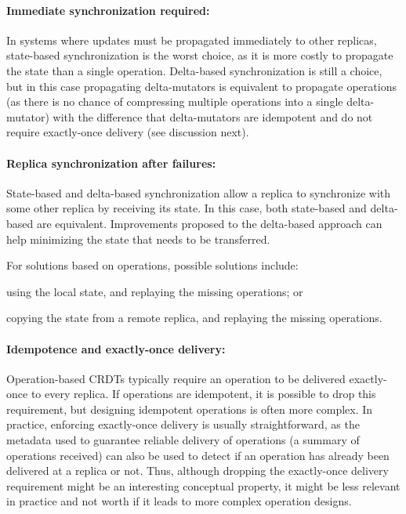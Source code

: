 \documentclass[12pt]{article}
\begin{document}
\paragraph{Immediate synchronization required:} In systems where updates
must be propagated immediately to other replicas, state-based synchronization 
is the worst choice, as it is more costly to propagate the state than a
single operation. 
Delta-based synchronization is still a choice, but in this
case propagating delta-mutators is equivalent to propagate operations (as
there is no chance of compressing multiple operations into a single delta-mutator) 
with the difference that delta-mutators are idempotent and do not require 
exactly-once delivery (see discussion next).

\paragraph{Replica synchronization after failures:} State-based and delta-based 
synchronization allow a replica to synchronize with some other replica by receiving its
state. In this case, both state-based and delta-based are equivalent.
Improvements proposed to the delta-based approach can help minimizing the 
state that needs to be transferred.

For solutions based on operations, possible solutions include:
\begin{inparaenum}[(i)]
\item using the local state, and replaying the missing operations; or
\item copying the state from a remote replica, and replaying the missing operations.
\end{inparaenum}

\paragraph{Idempotence and exactly-once delivery:} Operation-based CRDTs 
typically require an operation to be delivered exactly-once to every replica.
If operations are idempotent, it is possible to drop this requirement, but
designing idempotent operations is often more complex. 
In practice, enforcing exactly-once delivery is usually straightforward, 
as the metadata used to guarantee reliable delivery of operations (a summary
of operations received) can also be used to detect if an operation has 
already been delivered at a replica or not. 
Thus, although dropping the exactly-once delivery requirement might be an
interesting conceptual property, it might be less relevant in practice and
not worth if it leads to more complex operation designs.
\end{document}
